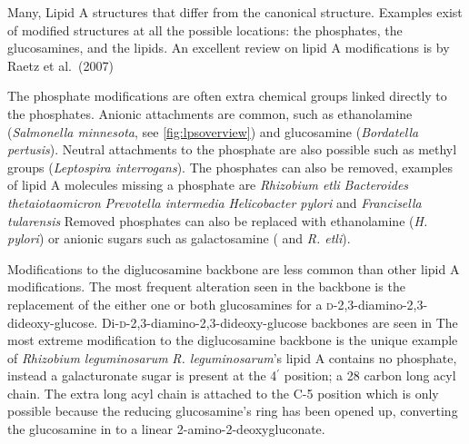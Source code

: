 Many, Lipid A structures that differ from the canonical structure. Examples exist of modified structures at all the possible locations: the phosphates, the glucosamines, and the lipids. An excellent review on lipid A modifications is by Raetz et al.~(2007)

 The phosphate modifications are often extra chemical groups linked directly to the phosphates. Anionic attachments are common, such as ethanolamine (\eg \textit{Salmonella minnesota}, see \cref{fig:lpsoverview}) and glucosamine (\eg \textit{Bordatella pertusis}). Neutral attachments to the phosphate are also possible such as methyl groups (\eg \textit{Leptospira interrogans}). The phosphates can also be removed, examples of lipid A molecules missing a phosphate are \textit{Rhizobium etli} \textit{Bacteroides thetaiotaomicron} \textit{Prevotella intermedia} \textit{Helicobacter pylori} and \textit{Francisella tularensis} Removed phosphates can also be replaced with ethanolamine (\eg \textit{H. pylori}) or anionic sugars such as galactosamine (\eg \caulobacter{} and \textit{R. etli}).
 
Modifications to the diglucosamine backbone are less common than other lipid A modifications. The most frequent alteration seen in the backbone is the replacement of the either one or both glucosamines for a  \textsc{d}-2,3-diamino-2,3-dideoxy-glucose. Di-\textsc{d}-2,3-diamino-2,3-dideoxy-glucose backbones are seen in \caulobacter{} 
The most extreme modification to the diglucosamine backbone is the unique example of \textit{Rhizobium leguminosarum} \textit{R. leguminosarum}'s lipid A contains no phosphate, instead a galacturonate sugar is present at the 4$^\prime$ position; a 28 carbon long acyl chain. The extra long acyl chain is attached to the C-5 position which is only possible because the reducing glucosamine's ring has been opened up, converting the glucosamine in to a linear 2-amino-2-deoxygluconate. 

